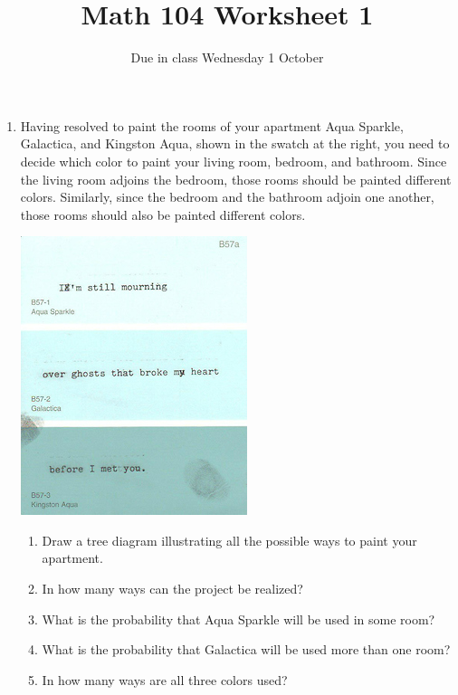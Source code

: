 \documentclass[11pt]{article}
\author{}\date{Due in class Wednesday 1 October}
\title{Math 104 Worksheet 1}\author{}
\begin{document}
\maketitle
\pagestyle{empty}
\begin{enumerate}
\item
\begin{multicols}{2}
Having resolved to paint the rooms of your apartment
Aqua Sparkle, Galactica, and Kingston Aqua,
shown in the swatch at the right, you need to decide which color
to paint your living room, bedroom, and bathroom.
Since the living room adjoins the bedroom, those rooms should
be painted different colors. Similarly, since
the bedroom and the bathroom adjoin one another,
those rooms should also be painted different colors.
\begin{center}\includegraphics[scale=.5]{Swatch}\end{center}
\end{multicols}
\begin{enumerate}
\item Draw a tree diagram illustrating all the possible ways
to paint your apartment.
\item In how many ways can the project be realized?
\item What is the probability that Aqua Sparkle will be used in some room?
\item What is the probability that Galactica will be used more than one room?
\item In how many ways are all three colors used?
\end{enumerate}


\end{enumerate}
\end{document}
